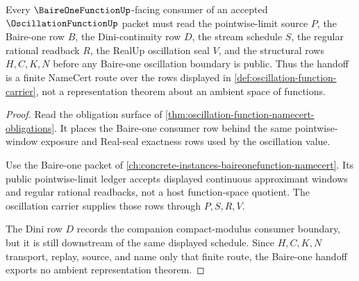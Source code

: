 \begin{theorem}
\label{thm:oscillation-function-baireone-handoff}
Every $\BaireOneFunctionUp$-facing consumer of an accepted $\OscillationFunctionUp$ packet must read the pointwise-limit source $P$, the Baire-one row $B$, the Dini-continuity row $D$, the stream schedule $S$, the regular rational readback $R$, the RealUp oscillation seal $V$, and the structural rows $H,C,K,N$ before any Baire-one oscillation boundary is public. Thus the handoff is a finite NameCert route over the rows displayed in \autoref{def:oscillation-function-carrier}, not a representation theorem about an ambient space of functions.
\end{theorem}
\begin{proof}
Read the obligation surface of \autoref{thm:oscillation-function-namecert-obligations}. It places the Baire-one consumer row behind the same pointwise-window exposure and Real-seal exactness rows used by the oscillation value.

Use the Baire-one packet of \autoref{ch:concrete-instances-baireonefunction-namecert}. Its public pointwise-limit ledger accepts displayed continuous approximant windows and regular rational readbacks, not a host function-space quotient. The oscillation carrier supplies those rows through $P,S,R,V$.

The Dini row $D$ records the companion compact-modulus consumer boundary, but it is still downstream of the same displayed schedule. Since $H,C,K,N$ transport, replay, source, and name only that finite route, the Baire-one handoff exports no ambient representation theorem.
\end{proof}


\begin{closurestatus}{\OscillationFunctionUp}
  \theoryclosure{\seedClosure}
  \formalstatus{\unformalizedV}
\end{closurestatus}
